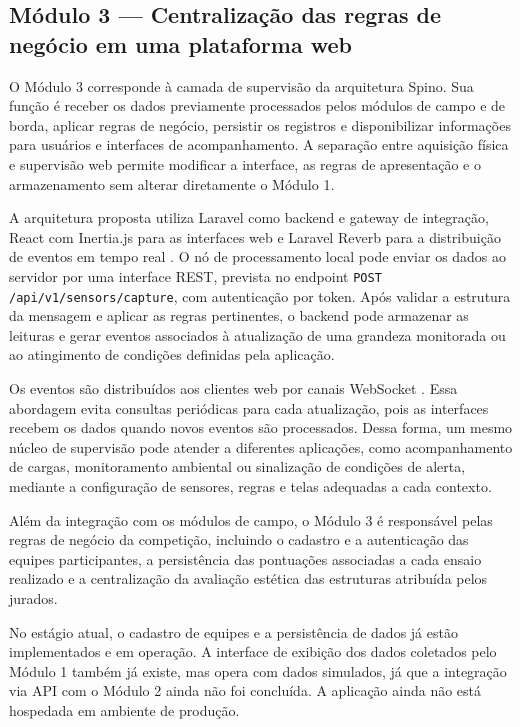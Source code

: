 \documentclass[conference]{IEEEtran}
\begin{document}
\subsection{Módulo 3 --- Centralização das regras de negócio em uma plataforma web}
O Módulo 3 corresponde à camada de supervisão da arquitetura Spino. Sua função é receber os dados previamente processados pelos módulos de campo e de borda, aplicar regras de negócio, persistir os registros e disponibilizar informações para usuários e interfaces de acompanhamento. A separação entre aquisição física e supervisão web permite modificar a interface, as regras de apresentação e o armazenamento sem alterar diretamente o Módulo 1.

A arquitetura proposta utiliza Laravel como backend e gateway de integração, React com Inertia.js para as interfaces web e Laravel Reverb para a distribuição de eventos em tempo real \cite{laravel2026}. O nó de processamento local pode enviar os dados ao servidor por uma interface REST, prevista no endpoint \texttt{POST /api/v1/sensors/capture}, com autenticação por token. Após validar a estrutura da mensagem e aplicar as regras pertinentes, o backend pode armazenar as leituras e gerar eventos associados à atualização de uma grandeza monitorada ou ao atingimento de condições definidas pela aplicação.

Os eventos são distribuídos aos clientes web por canais WebSocket \cite{laravel2026}. Essa abordagem evita consultas periódicas para cada atualização, pois as interfaces recebem os dados quando novos eventos são processados. Dessa forma, um mesmo núcleo de supervisão pode atender a diferentes aplicações, como acompanhamento de cargas, monitoramento ambiental ou sinalização de condições de alerta, mediante a configuração de sensores, regras e telas adequadas a cada contexto.

Além da integração com os módulos de campo, o Módulo 3 é responsável pelas regras de negócio da competição, incluindo o cadastro e a autenticação das equipes participantes, a persistência das pontuações associadas a cada ensaio realizado e a centralização da avaliação estética das estruturas atribuída pelos jurados.

No estágio atual, o cadastro de equipes e a persistência de dados já estão implementados e em operação. A interface de exibição dos dados coletados pelo Módulo 1 também já existe, mas opera com dados simulados, já que a integração via API com o Módulo 2 ainda não foi concluída. A aplicação ainda não está hospedada em ambiente de produção.
\end{document}
